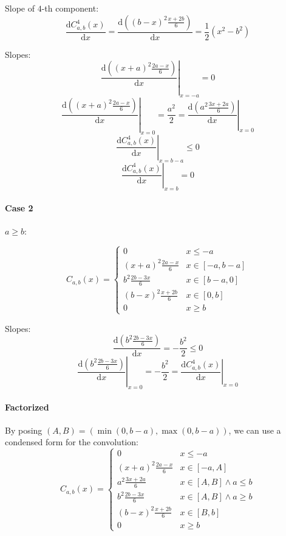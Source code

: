 \documentclass[a4paper,10pt]{article}
\newcommand\D{\mathrm{d}}
\renewcommand\And{\wedge}
\newcommand\GridAxis[4]{%
    \draw[very thin,color=gray] (#1,#3) grid (#2,#4);
    \draw[->] (#1,0) -- (#2,0) node[right] {$x$};
    \draw[->] (0,#3) -- (0,#4);
    \node[below right] at (0,0) {$0$};
    \coordinate (Origin) at (0,0);
    \coordinate (FuncStart) at (#1,0);
    \coordinate (FuncEnd) at (#2,0);
}
\begin{document}
Slope of $4$-th component:
\[  \frac{\D C_{a,b}^4(x)}{\D x} = \frac{\D((b-x)^2 \frac{x+2b}{6})}{\D x} = \frac{1}{2}(x^2-b^2) \]

Slopes:
\[ \left. \frac{\D((x+a)^2 \frac{2a-x}{6})}{\D x} \right|_{x=-a} = 0 \]
\[ \left. \frac{\D((x+a)^2 \frac{2a-x}{6})}{\D x} \right|_{x=0} = \frac{a^2}{2} = \left. \frac{\D(a^2 \frac{3x+2a}{6})}{\D x} \right|_{x=0} \]
\[ \left. \frac{\D C_{a,b}^4(x)}{\D x} \right|_{x=b-a} \le 0 \]
\[ \left. \frac{\D C_{a,b}^4(x)}{\D x} \right|_{x=b} = 0 \]

\paragraph{Case 2}
$a \ge b$:
\begin{center}\end{center}
\[ C_{a,b}(x) = \begin{cases}
    0 & x \le -a \\
    (x+a)^2 \frac{2a-x}{6} & x \in [-a, b-a] \\
    b^2 \frac{2b-3x}{6} & x \in [b-a, 0] \\
    (b-x)^2 \frac{x+2b}{6} & x \in [0, b] \\
    0 & x \ge b
\end{cases} \]

Slopes:
\[ \frac{\D(b^2 \frac{2b-3x}{6})}{\D x} = -\frac{b^2}{2} \le 0 \]
\[ \left. \frac{\D(b^2 \frac{2b-3x}{6})}{\D x} \right|_{x=0} = -\frac{b^2}{2} = \left. \frac{\D C_{a,b}^4(x)}{\D x} \right|_{x=0} \]

\paragraph{Factorized}
By posing $(A,B) = (\min(0, b-a), \max(0, b-a))$, we can use a condensed form for the convolution:
\[ C_{a,b}(x) = \begin{cases}
    0 & x \le -a \\
    (x+a)^2 \frac{2a-x}{6} & x \in [-a, A] \\
    a^2 \frac{3x+2a}{6} & x \in [A, B] \And a \le b \\
    b^2 \frac{2b-3x}{6} & x \in [A, B] \And a \ge b \\
    (b-x)^2 \frac{x+2b}{6} & x \in [B, b] \\
    0 & x \ge b
\end{cases} \]
\end{document}
